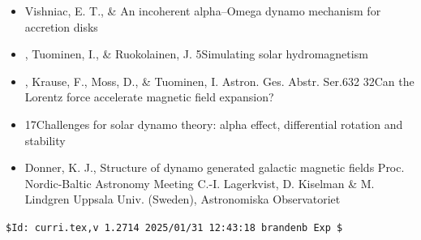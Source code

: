 \begin{itemize}
\item[5.]
Vishniac, E. T., \& \Brandenburg{}
{An incoherent alpha--Omega dynamo mechanism for accretion disks}

\item[4.]
\Brandenburg, Tuominen, I., \& Ruokolainen, J.
{5}{Simulating solar hydromagnetism}

\item[3.]
\Brandenburg, Krause, F., Moss, D., \& Tuominen, I.
{Astron. Ges. Abstr. Ser.}{6}{32}
{32}{Can the Lorentz force accelerate magnetic field expansion?}

\item[2.]
\Brandenburg{}
{17}{Challenges for solar dynamo theory:
alpha effect, differential rotation and stability}

\item[1.]
Donner, K. J., \Brandenburg{}
{Structure of dynamo generated galactic magnetic fields}
{Proc. Nordic-Baltic Astronomy Meeting}
{C.-I. Lagerkvist, D. Kiselman \& M. Lindgren}
{Uppsala Univ. (Sweden), Astronomiska Observatoriet}
 


\end{itemize}
\verb|$Id: curri.tex,v 1.2714 2025/01/31 12:43:18 brandenb Exp $|
